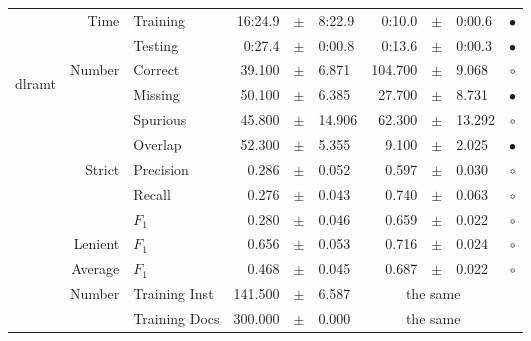 \begin{longtable}{|r|r|l||rcl|rcl|c|}
\cline{2-10} & \multirow{2}{*}{      Time} &        Training &     16:24.9 &  $\pm$  &      8:22.9 &      0:10.0 &  $\pm$  &      0:00.6 & $\bullet$ \\
\cline{3-10} &                             &         Testing &      0:27.4 &  $\pm$  &      0:00.8 &      0:13.6 &  $\pm$  &      0:00.3 & $\bullet$ \\
\hline
\hline
\multirow{11}{*}{\begin{sideways}dlramt\end{sideways} }
             & \multirow{4}{*}{    Number} &         Correct &      39.100 &  $\pm$  &       6.871 &     104.700 &  $\pm$  &       9.068 & $\circ$ \\
\cline{3-10} &                             &         Missing &      50.100 &  $\pm$  &       6.385 &      27.700 &  $\pm$  &       8.731 & $\bullet$ \\
\cline{3-10} &                             &        Spurious &      45.800 &  $\pm$  &      14.906 &      62.300 &  $\pm$  &      13.292 & $\circ$ \\
\cline{3-10} &                             &         Overlap &      52.300 &  $\pm$  &       5.355 &       9.100 &  $\pm$  &       2.025 & $\bullet$ \\
\cline{2-10} & \multirow{3}{*}{    Strict} &       Precision &       0.286 &  $\pm$  &       0.052 &       0.597 &  $\pm$  &       0.030 & $\circ$ \\
\cline{3-10} &                             &          Recall &       0.276 &  $\pm$  &       0.043 &       0.740 &  $\pm$  &       0.063 & $\circ$ \\
\cline{3-10} &                             &           $F_1$ &       0.280 &  $\pm$  &       0.046 &       0.659 &  $\pm$  &       0.022 & $\circ$ \\
\cline{2-10} &                     Lenient &           $F_1$ &       0.656 &  $\pm$  &       0.053 &       0.716 &  $\pm$  &       0.024 & $\circ$ \\
\cline{2-10} &                     Average &           $F_1$ &       0.468 &  $\pm$  &       0.045 &       0.687 &  $\pm$  &       0.022 & $\circ$ \\
\cline{2-10} & \multirow{2}{*}{    Number} &   Training Inst &     141.500 &  $\pm$  &       6.587 &    \multicolumn{3}{c|}{the same}         &  \\
\cline{3-10} &                             &   Training Docs &     300.000 &  $\pm$  &       0.000 &    \multicolumn{3}{c|}{the same}         &  \\

\end{longtable}
